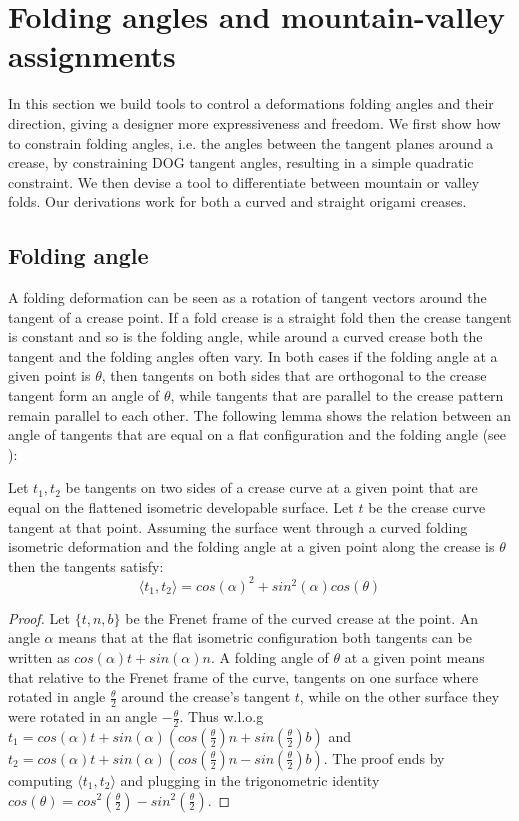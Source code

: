 \section{Folding angles and mountain-valley assignments} \label{sec:folding_angles_mountain_valley}
In this section we build tools to control a deformations folding angles and their direction, giving a designer more expressiveness and freedom. We first show how to constrain folding angles, i.e. the angles between the tangent planes around a crease, by constraining DOG tangent angles, resulting in a simple quadratic constraint. We then devise a tool to differentiate between mountain or valley folds. Our derivations work for both a curved and straight origami creases.

\subsection{Folding angle} A folding deformation can be seen as a rotation of tangent vectors around the tangent of a crease point. If a fold crease is a straight fold then the crease tangent is constant and so is the folding angle, while around a curved crease both the tangent and the folding angles often vary. In both cases if the folding angle at a given point is $\theta$, then tangents on both sides that are orthogonal to the crease tangent form an angle of $\theta$, while tangents that are parallel to the crease pattern remain parallel to each other. The following lemma shows the relation between an angle of tangents that are equal on a flat configuration and the folding angle (see ): 
 \begin{lemma}  \label{lem:tangents_dihedral}
 Let $t_1,t_2$ be tangents on two sides of a crease curve at a given point that are equal on the flattened isometric developable surface. Let $t$ be the crease curve tangent at that point. Assuming the surface went through a curved folding isometric deformation and the folding angle at a given point along the crease is $\theta$ then the tangents satisfy:
\begin{equation} \label{eq:tangents_dihedral}
\langle t_1, t_2 \rangle = cos(\alpha)^2 + sin^2(\alpha) cos(\theta) \end{equation}
\end{lemma}
\begin{proof}{Let $\{t,n,b\}$ be the Frenet frame of the curved crease at the point. An angle $\alpha$ means that at the flat isometric configuration both tangents can be written as $cos(\alpha)t + sin(\alpha)n$. A folding angle of $\theta$ at a given point means that relative to the Frenet frame of the curve, tangents on one surface where rotated in angle $\frac{\theta}{2}$ around the crease's tangent $t$, while on the other surface they were rotated in an angle  $-\frac{\theta}{2}$. Thus w.l.o.g $t_1 = cos(\alpha)t + sin(\alpha)(cos(\frac{\theta}{2})n+sin(\frac{\theta}{2})b)$ and $t_2 = cos(\alpha)t + sin(\alpha)(cos(\frac{\theta}{2})n-sin(\frac{\theta}{2})b)$. The proof ends by computing $\langle t_1,t_2 \rangle$ and plugging in the trigonometric identity $cos(\theta) = cos^2(\frac{\theta}{2})-sin^2(\frac{\theta}{2})$.}\end{proof}

